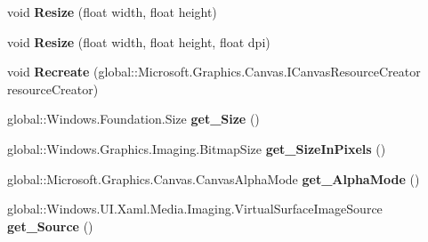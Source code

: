 \begin{DoxyCompactItemize}
void {\bfseries Resize} (float width, float height)
\item 
\mbox{\label{interface_microsoft_1_1_graphics_1_1_canvas_1_1_u_i_1_1_xaml_1_1_i_canvas_virtual_image_source_a933630828281e36bfca92b99181d4c1b}} 
void {\bfseries Resize} (float width, float height, float dpi)
\item 
\mbox{\label{interface_microsoft_1_1_graphics_1_1_canvas_1_1_u_i_1_1_xaml_1_1_i_canvas_virtual_image_source_a0e5a4410e5ef0de72311321fa79114b7}} 
void {\bfseries Recreate} (global\+::\+Microsoft.\+Graphics.\+Canvas.\+I\+Canvas\+Resource\+Creator resource\+Creator)
\item 
\mbox{\label{interface_microsoft_1_1_graphics_1_1_canvas_1_1_u_i_1_1_xaml_1_1_i_canvas_virtual_image_source_a8df57b04f7854479d8d5b4d90588a89a}} 
global\+::\+Windows.\+Foundation.\+Size {\bfseries get\+\_\+\+Size} ()
\item 
\mbox{\label{interface_microsoft_1_1_graphics_1_1_canvas_1_1_u_i_1_1_xaml_1_1_i_canvas_virtual_image_source_a94da0f764a564d73c97f33b5fba21363}} 
global\+::\+Windows.\+Graphics.\+Imaging.\+Bitmap\+Size {\bfseries get\+\_\+\+Size\+In\+Pixels} ()
\item 
\mbox{\label{interface_microsoft_1_1_graphics_1_1_canvas_1_1_u_i_1_1_xaml_1_1_i_canvas_virtual_image_source_ad058825143b5833f46d4cf80295da832}} 
global\+::\+Microsoft.\+Graphics.\+Canvas.\+Canvas\+Alpha\+Mode {\bfseries get\+\_\+\+Alpha\+Mode} ()
\item 
\mbox{\label{interface_microsoft_1_1_graphics_1_1_canvas_1_1_u_i_1_1_xaml_1_1_i_canvas_virtual_image_source_acbb06ee7976aaed52d3b36b37daabb4b}} 
global\+::\+Windows.\+U\+I.\+Xaml.\+Media.\+Imaging.\+Virtual\+Surface\+Image\+Source {\bfseries get\+\_\+\+Source} ()

\end{DoxyCompactItemize}
